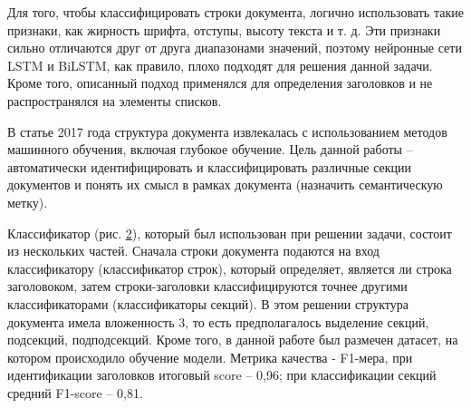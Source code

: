\documentclass{ProcISPRAS}
\begin{document}
\begin{figure}[ht]
    \label{fig:augmentation}
\end{figure}

Для того, чтобы классифицировать строки документа, логично использовать такие признаки, как жирность шрифта, отступы, высоту текста и т. д. Эти признаки сильно отличаются друг от друга диапазонами значений, поэтому нейронные сети LSTM и BiLSTM, как правило, плохо подходят для решения данной задачи. Кроме того, описанный подход применялся для определения заголовков и не распространялся на элементы списков.

В статье \cite{deep} 2017 года структура документа извлекалась с использованием методов машинного обучения, включая глубокое обучение. Цель данной работы -- автоматически идентифицировать и классифицировать различные секции документов и понять их смысл в рамках документа (назначить семантическую метку).

\begin{figure}[ht]
    \label{fig:classifier}
\end{figure}

Классификатор (рис. \ref{fig:classifier}), который был использован при решении задачи, состоит из нескольких частей. Сначала строки документа подаются на вход классификатору (классификатор строк), который определяет, является ли строка заголовоком, затем строки-заголовки классифицируются точнее другими классификаторами (классификаторы секций). В этом решении структура документа имела вложенность 3, то есть предполагалось выделение секций, подсекций, подподсекций.
Кроме того, в данной работе был размечен датасет, на котором происходило обучение модели. Метрика качества - F1-мера, при идентификации заголовков итоговый score -- 0,96; при классификации секций средний F1-score -- 0,81.
\end{document}
